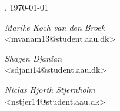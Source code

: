 
\vspace{\baselineskip}\hfill \AAU, \today
\vfill\noindent
\begin{center}
\begin{minipage}[b]{0.45\textwidth}
 \centering
  \textit{Marike Koch van den Broek}\\
  {\footnotesize <mvanam13@student.aau.dk>}
\end{minipage}
\begin{minipage}[b]{0.45\textwidth}
	\centering
	\textit{Shagen Djanian}\\
	{\footnotesize <sdjani14@student.aau.dk>}
\end{minipage}
\hspace{0.3cm}
\vspace{1\baselineskip}

\begin{minipage}[b]{0.45\textwidth}
	\centering
	\textit{Niclas Hjorth Stjernholm}\\
	{\footnotesize <nstjer14@student.aau.dk>}
\end{minipage}

\end{center}

